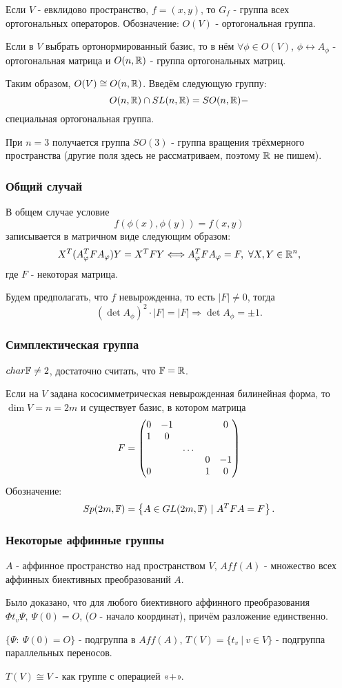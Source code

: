 Если $V$ - евклидово пространство, $f = (x,y)$, то $G_f$ - группа всех ортогональных операторов. Обозначение: $O(V)$ - ортогональная группа.

Если в $V$ выбрать ортонормированный базис, то в нём $\forall \phi \in O(V)$, $\phi \longleftrightarrow A_{\phi}$ - ортогональная матрица и $O(n, \mathbb{R})$ - группа ортогональных матриц.

Таким образом, $O(V) \cong O(n, \mathbb{R})$. Введём следующую группу:
\[O(n, \mathbb{R}) \cap SL(n, \mathbb{R}) = SO(n, \mathbb{R}) - \]
специальная ортогональная группа.

При $n = 3$ получается группа $SO(3)$ - группа вращения трёхмерного пространства (другие поля здесь не рассматриваем, поэтому $\mathbb{R}$ не пишем).

\subsubsection*{Общий случай}
В общем случае условие
\[f(\phi(x), \phi(y)) = f(x,y)\]
записывается в матричном виде следующим образом:
\[X^T(A_{\varphi}^T F A_{\varphi}) Y = X^T F Y \Longleftrightarrow A_{\varphi}^T F A_{\varphi} = F, \ \forall X, Y \in \mathbb{R}^n,\]
где $F$ - некоторая матрица.

Будем предполагать, что $f$ невырожденна, то есть $|F| \neq 0$, тогда
\[(\det{A_{\phi}})^2 \cdot |F| = |F| \Longrightarrow \det{A_{\phi}} = \pm 1.\]

\subsubsection*{Симплектическая группа}
$char \mathbb{F} \neq 2$, достаточно считать, что $\mathbb{F} = \mathbb{R}$.

Если на $V$ задана кососимметрическая невырожденная билинейная форма, то $\dim{V} = n = 2m$ и существует базис, в котором матрица 
\[F = \begin{pmatrix}
    0 & -1 & \empty & \empty & 0\\
    1 & 0 & \empty & \empty & \empty\\
    \empty & \empty & \dots & \empty \empty\\
    \empty & \empty & \empty & 0 & -1\\
    0 & \empty & \empty & 1 & 0\\
\end{pmatrix}\]
Обозначение: 
\[Sp(2m, \mathbb{F}) = \left\{A \in GL(2m, \mathbb{F}) \ | \ A^T F A = F\right\}.\]

\subsubsection*{Некоторые аффинные группы}
$A$ - аффинное пространство над пространством $V$, $Aff(A)$ - множество всех аффинных биективных преобразований $A$.

Было доказано, что для любого биективного аффинного преобразования $\Phi t_v \Psi, \ \Psi(0) = O$, ($O$ - начало координат), причём разложение единственно.

$\{\Psi: \ \Psi(0) = O\}$ - подгруппа в $Aff(A)$, $T(V) = \{t_v \ | \ v \in V\}$ - подгруппа параллельных переносов.

$T(V) \cong V$ - как группе с операцией «+».